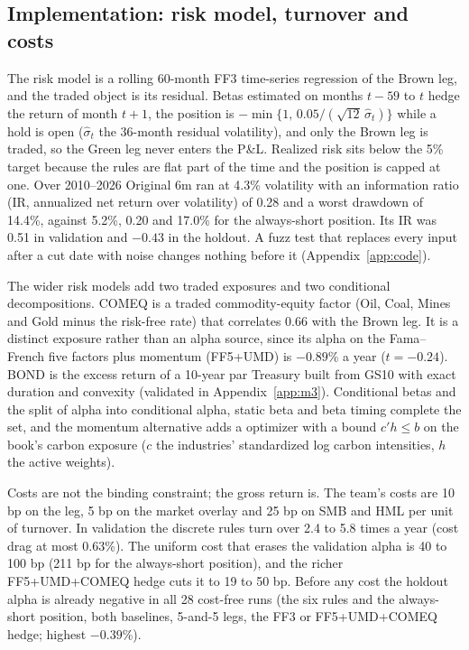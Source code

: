\subsection{Implementation: risk model, turnover and costs}
\label{sec:implementation}

The risk model is a rolling 60-month FF3 time-series regression of the Brown leg, and the traded object is its residual. Betas estimated on months $t-59$ to $t$ hedge the return of month $t+1$, the position is $-\min\{1,\,0.05/(\sqrt{12}\,\hat\sigma_t)\}$ while a hold is open ($\hat\sigma_t$ the 36-month residual volatility), and only the Brown leg is traded, so the Green leg never enters the P\&L. Realized risk sits below the 5\% target because the rules are flat part of the time and the position is capped at one. Over 2010--2026 Original 6m ran at 4.3\% volatility with an information ratio (IR, annualized net return over volatility) of 0.28 and a worst drawdown of 14.4\%, against 5.2\%, 0.20 and 17.0\% for the always-short position. Its IR was 0.51 in validation and $-0.43$ in the holdout. A fuzz test that replaces every input after a cut date with noise changes nothing before it (Appendix~\ref{app:code}).

The wider risk models add two traded exposures and two conditional decompositions. COMEQ is a traded commodity-equity factor (Oil, Coal, Mines and Gold minus the risk-free rate) that correlates 0.66 with the Brown leg. It is a distinct exposure rather than an alpha source, since its alpha on the Fama--French five factors plus momentum (FF5+UMD) is $-0.89$\% a year ($t=-0.24$). BOND is the excess return of a 10-year par Treasury built from GS10 with exact duration and convexity (validated in Appendix~\ref{app:m3}). Conditional betas \citep{fs1996} and the \citet{ln2006} split of alpha into conditional alpha, static beta and beta timing complete the set, and the momentum alternative adds a \citet{gk2000} optimizer with a bound $c'h\le b$ on the book's carbon exposure ($c$ the industries' standardized log carbon intensities, $h$ the active weights).

Costs are not the binding constraint; the gross return is. The team's costs are 10 bp on the leg, 5 bp on the market overlay and 25 bp on SMB and HML per unit of turnover. In validation the discrete rules turn over 2.4 to 5.8 times a year (cost drag at most 0.63\%). The uniform cost that erases the validation alpha is 40 to 100 bp (211 bp for the always-short position), and the richer FF5+UMD+COMEQ hedge cuts it to 19 to 50 bp. Before any cost the holdout alpha is already negative in all 28 cost-free runs (the six rules and the always-short position, both baselines, 5-and-5 legs, the FF3 or FF5+UMD+COMEQ hedge; highest $-0.39$\%).


